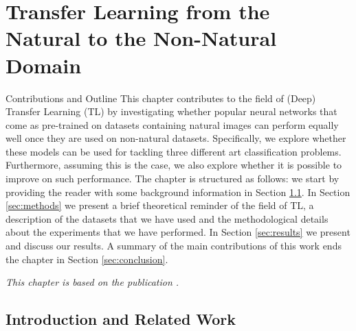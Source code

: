 \chapter{Transfer Learning from the Natural to the Non-Natural Domain}
\label{ch:tl_natural_to_non_natural}

\begin{remark}{Contributions and Outline} 
	This chapter contributes to the field of (Deep) Transfer Learning (TL) by investigating whether popular neural networks that come as pre-trained on datasets containing natural images can perform equally well once they are used on non-natural datasets. Specifically, we explore whether these models can be used for tackling three different art classification problems. Furthermore, assuming this is the case, we also explore whether it is possible to improve on such performance. The chapter is structured as follows: we start by providing the reader with some background information in Section \ref{sec:introduction}. In Section \ref{sec:methods} we present a brief theoretical reminder of the field of TL, a description of the datasets that we have used and the methodological details about the experiments that we have performed. In Section \ref{sec:results} we present and discuss our results. A summary of the main contributions of this work ends the chapter in Section \ref{sec:conclusion}.

\vspace{5mm}

\textit{This chapter is based on the publication \citet{sabatelli2018deep}.}
\end{remark}


\section{Introduction and Related Work}
\label{sec:introduction}

